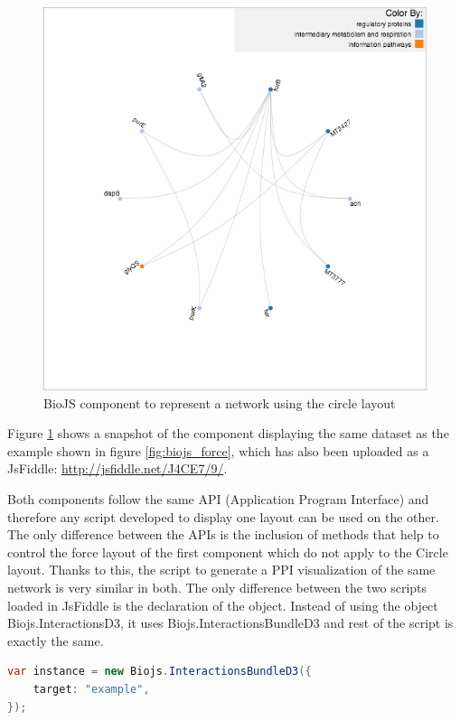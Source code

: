 \begin{figure}[ht]
\centering
\includegraphics[width=5in]{figures/circle.png}
\caption[BioJS component to represent a network using the circle layout]{BioJS component to represent a network using the circle layout
\label{fig:biojs_circle}}
\end{figure}

Figure \ref{fig:biojs_circle} shows a snapshot of the component displaying the same dataset as the example shown in figure \ref{fig:biojs_force}, which has also been uploaded as a JsFiddle: \url{http://jsfiddle.net/J4CE7/9/}.

Both components follow the same API (Application Program Interface) and therefore any script developed to display one layout can be used on the other. The only difference between the APIs is the inclusion of methods that help to control the force layout of the first component which do not apply to the Circle layout. Thanks to this, the script to generate a PPI visualization of the same network is very similar in both.  The only difference between the two scripts loaded in JsFiddle is the declaration of the object. Instead of using the object Biojs.InteractionsD3, it uses Biojs.InteractionsBundleD3 and rest of the script is exactly the same.
\begin{lstlisting}[language=java]
var instance = new Biojs.InteractionsBundleD3({
    target: "example",
});
\end{lstlisting}





